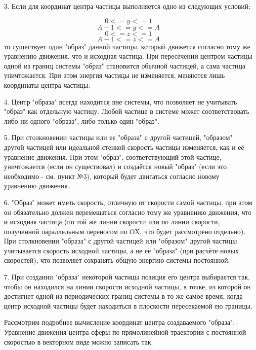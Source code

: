 \documentclass{article}
\begin{document}
3. Если для координат центра частицы выполняется одно из следующих условий:

\begin{equation}
0 <= y <= 1
\end{equation}
\begin{equation}
A - 1 <= y <= A
\end{equation}
\begin{equation}
0 <= z <= 1
\end{equation}
\begin{equation}
A - 1 <= z <= A
\end{equation}
то существует один "образ" данной частицы, который движется согласно тому же уравнению движения, что и исходная частица. При пересечении центром частицы одной из границ системы "образ" становится обычной частицей, а сама частица уничтожается. При этом энергия частицы не изменяется, меняются лишь координаты центра частицы.

4. Центр "образа" всегда находится вне системы, что позволяет не учитывать "образ" как отдельную частицу. Любой частице в системе может соответствовать либо ни одного "образа", либо только один "образ".

5. При столкновении частицы или ее "образа" с другой частицей, "образом" другой частицей или идеальной стенкой скорость частицы изменяется, как и её уравнение движения. При этом "образ", соответствующий этой частице, уничтожается (если он существовал) и создаётся новый "образ" (если это необходимо - см. пункт №3), который будет двигаться согласно новому уравнению движения.

6. "Образ" может иметь скорость, отличную от скорости самой частицы, при этом он обязательно должен перемещаться согласно тому же уравнению движения, что и исходная частица (по той же линии скорости или по линии скорости, полученной параллельным переносом по OX, что будет рассмотрено отдельно). При столкновении "образа" с другой частицей или "образом" другой частицы учитывается скорость исходной частицы, а не её "образа" (при расчёте новых скоростей), что позволяет сохранять общую энергию системы постоянной.

7. При создании "образа" некоторой частицы позиция его центра выбирается так, чтобы он находился на линии скорости исходной частицы, в точке, из которой он достигнет одной из периодических границ системы в то же самое время, когда центр исходной частицы будет находиться в плоскости пересекаемой ею границы.

Рассмотрим подробнее вычисление координат центра создаваемого "образа". Уравнение движения центра сферы по прямолинейной траектории с постоянной скоростью в векторном виде можно записать так:
\end{document}
